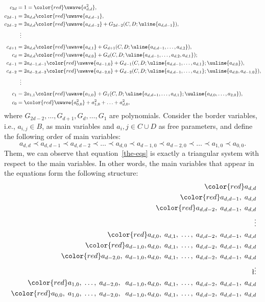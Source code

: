 \documentclass[runningheads]{llncs}
\begin{document}
\begin{align}
  c_{2d}&=1={\color{red}\uwave{a_{d,d}^2}},
  \nonumber\\
  c_{2d-1}&=2a_{d,d}{\color{red}\uwave{a_{d,d-1}}},
  \nonumber\\
  c_{2d-2}&=2a_{d,d}{\color{red}\uwave{a_{d,d-2}}}+G_{2d-2}(C,D;\uline{a_{d,d-1}}),
  \nonumber\\
  &\phantom{x}\vdots\nonumber\\[5pt]
  c_{d+1}&=2a_{d,d}{\color{red}\uwave{a_{d,1}}}+G_{d+1}(C,D; \uline{a_{d,d-1}, \ldots, a_{d,2}}),
  \nonumber\\
  c_{d}&=2a_{d,d}{\color{red}\uwave{a_{d,0}}}+G_d(C,D; \uline{a_{d,d-1}, \ldots, a_{d,2},a_{d,1}});
  \nonumber\\
  c_{d-1}&=2a_{d-1,d-1}{\color{red}\uwave{a_{d-1,0}}}+G_{d-1}(C,D;  \uline{a_{d,d-1}, \ldots, a_{d,1}}; \uuline{a_{d,0}}),
  \nonumber\\
  c_{d-2}&=2a_{d-2,d-2}{\color{red}\uwave{a_{d-2,0}}}+G_{d-2}(C,D; \uline{a_{d,d-1}, \ldots, a_{d,1}}; \uuline{a_{d,0},a_{d-1,0}}),
  \nonumber\\ 
  &\phantom{x}\vdots\nonumber\\[5pt]
  c_1&=2a_{1,1}{\color{red}\uwave{a_{1,0}}}+G_1(C,D; \uline{a_{d,d-1}, \ldots, a_{d,1}}; \uuline{a_{d,0},\ldots, a_{2,0}}),
  \nonumber\\
  c_0&={\color{red}\uwave{a_{0,0}^2}}+a_{1,0}^2+\ldots+a_{d,0}^2,
\label{the-eqs}
\end{align}
where $G_{2d-2},\ldots,G_{d+1},G_{d},\ldots,G_{1}$ are polynomials.  
Consider the border variables, i.e.,  $a_{i,j}\in B$,  as main variables and $a_i,j\in C\cup D$ as free parameters, and 
define the following order of main variables:
$$
a_{d,d}\prec a_{d,d-1} \prec a_{d,d-2} \prec \ldots \prec  a_{d,0} \prec a_{d-1,0} \prec a_{d-2,0} \prec \ldots \prec a_{1,0} \prec a_{0,0}.
$$
Them, we can observe that equation~\eqref{the-eqs} is exactly a triangular system with respect to the main variables. In other words, the main variables that appear in the equations form the following structure:
\begin{align*}
    \;{\color{red}a_{d,d}}\\
    \;{\color{red}a_{d,d-1}},\;a_{d,d}\\
    \;{\color{red}a_{d,d-2}},\;a_{d,d-1},\;a_{d,d}\\
    \;\vdots\\
    \;{\color{red}a_{d,0}},\;a_{d,1},\;\ldots,\; a_{d,d-2},\;a_{d,d-1},\;a_{d,d}\\
    \;{\color{red}a_{d-1,0}},a_{d,0},\;a_{d,1},\;\ldots,\; a_{d,d-2},\;a_{d,d-1},\;a_{d,d}\\
    \;{\color{red}a_{d-2,0}},\;a_{d-1,0},a_{d,0},\;a_{d,1},\;\ldots,\; a_{d,d-2},\;a_{d,d-1},\;a_{d,d}\\
    \l\vdots\\
    \;{\color{red}a_{1,0}},\;\ldots,\;a_{d-2,0},\;\;a_{d-1,0},a_{d,0},\;a_{d,1},\;\ldots,\; a_{d,d-2},\;a_{d,d-1},\;a_{d,d}\\
    \;{\color{red}a_{0,0}},\;a_{1,0},\;\ldots,\;a_{d-2,0},\;\;a_{d-1,0},a_{d,0},\;a_{d,1},\;\ldots,\; a_{d,d-2},\;a_{d,d-1},\;a_{d,d}
\end{align*}
\end{document}
